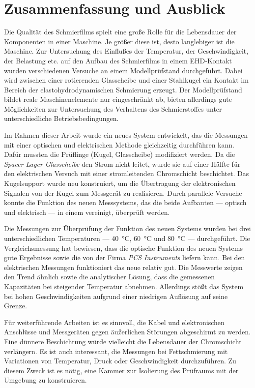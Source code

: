 \chapter{Zusammenfassung und Ausblick}
\label{zusammenfassung_und_ausblick}

Die Qualität des Schmierfilms spielt eine große Rolle für die Lebensdauer der Komponenten in einer Maschine.
Je größer diese ist, desto langlebiger ist die Maschine.
Zur Untersuchung des Einflußes der Temperatur, der Geschwindigkeit, der Belastung etc. auf den Aufbau des Schmierfilms in einem EHD-Kontakt wurden verschiedenen Versuche an einem Modellprüfstand durchgeführt.
Dabei wird zwischen einer rotierenden Glasscheibe und einer Stahlkugel ein Kontakt im Bereich der elastohydrodynamischen Schmierung erzeugt.
Der Modellprüfstand bildet reale Maschinenelemente nur eingeschränkt ab, bieten allerdings gute Möglichkeiten zur Untersuchung des Verhaltens des Schmierstoffes unter unterschiedliche Betriebsbedingungen.

Im Rahmen dieser Arbeit wurde ein neues System entwickelt, das die Messungen mit einer optischen und elektrischen Methode gleichzeitig durchführen kann.
Dafür mussten die Prüflinge (Kugel, Glasscheibe) modifiziert werden.
Da die \textit{Spacer-Layer-Glasscheibe} den Strom nicht leitet, wurde sie auf einer Hälfte für den elektrischen Versuch mit einer stromleitenden Chromschicht beschichtet.
Das Kugelsupport wurde neu konstruiert, um die Übertragung der elektronischen Signalen von der Kugel zum Messgerät zu realisieren.
Durch parallele Versuche konnte die Funktion des neuen Messsystems, das die beide Aufbauten --- optisch und elektrisch --- in einem vereinigt, überprüft werden.

Die Messungen zur Überprüfung der Funktion des neuen Systems wurden bei drei unterschiedlichen Temperaturen --- \SI{40}{\degreeCelsius}, \SI{60}{\degreeCelsius} und \SI{80}{\degreeCelsius} --- durchgeführt.
Die Vergleichsmessung hat bewiesen, dass die optische Funktion des neuen Systems gute Ergebnisse sowie die von der Firma \textit{PCS Instruments} liefern kann.
Bei den elektrischen Messungen funktioniert das neue relativ gut.
Die Messwerte zeigen den Trend ähnlich sowie die analytischer Lösung, dass die gemessenen Kapazitäten bei steigender Temperatur abnehmen.
Allerdings stößt das System bei hohen Geschwindigkeiten aufgrund einer niedrigen Auflösung auf seine Grenze.

Für weiterführende Arbeiten ist es sinnvoll, die Kabel und elektronischen Anschlüsse und Messgeräten gegen äußerlichen Störungen abgeschirmt zu werden.
Eine dünnere Beschichtung würde vielleicht die Lebensdauer der Chromschicht verlängern.
Es ist auch interessant, die Messungen bei Fettschmierung mit Variationen von Temperatur, Druck oder Geschwindigkeit durchzuführen.
Zu diesem Zweck ist es nötig, eine Kammer zur Isolierung des Prüfraums mit der Umgebung zu konstruieren.


